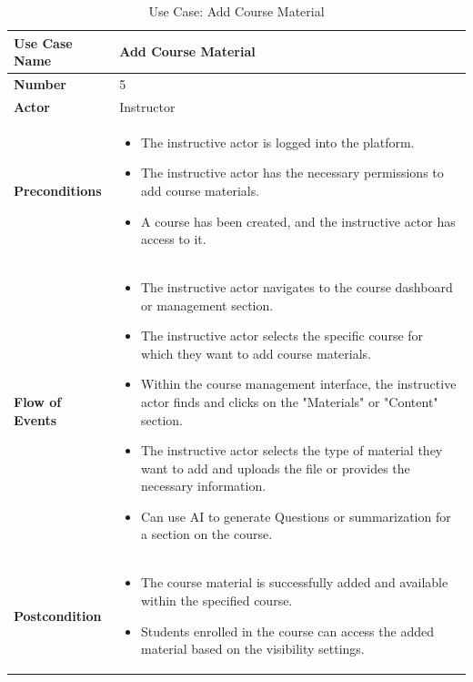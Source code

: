 \begin{table}[h!]
    \centering
    \caption{Use Case: Add Course Material}
    \bgroup
    \def\arraystretch{1.5}%
    \begin{tabular}{|m{4cm}|m{11cm}|}
        \hline
        \textbf{Use Case Name} & Add Course Material \\
        \hline
        \textbf{Number} & 5 \\
        \hline
        \textbf{Actor} & Instructor \\
        \hline
        \textbf{Preconditions} & 
        \begin{itemize}[noitemsep,topsep=0pt] %
            \item The instructive actor is logged into the platform.
            \item The instructive actor has the necessary permissions to add course materials.
            \item A course has been created, and the instructive actor has access to it.
        \end{itemize} \\
        \hline
        \textbf{Flow of Events} & 
        \begin{itemize}[noitemsep,topsep=0pt]
            \item The instructive actor navigates to the course dashboard or management section.
            \item The instructive actor selects the specific course for which they want to add course materials.
            \item Within the course management interface, the instructive actor finds and clicks on the "Materials" or "Content" section.
            \item The instructive actor selects the type of material they want to add and uploads the file or provides the necessary information.
            \item Can use AI to generate Questions or summarization for a section on the course.
        \end{itemize} \\
        \hline
        \textbf{Postcondition} & 
        \begin{itemize}[noitemsep,topsep=0pt]
            \item The course material is successfully added and available within the specified course.
            \item Students enrolled in the course can access the added material based on the visibility settings.

\end{itemize}
\end{tabular}
\end{table}
